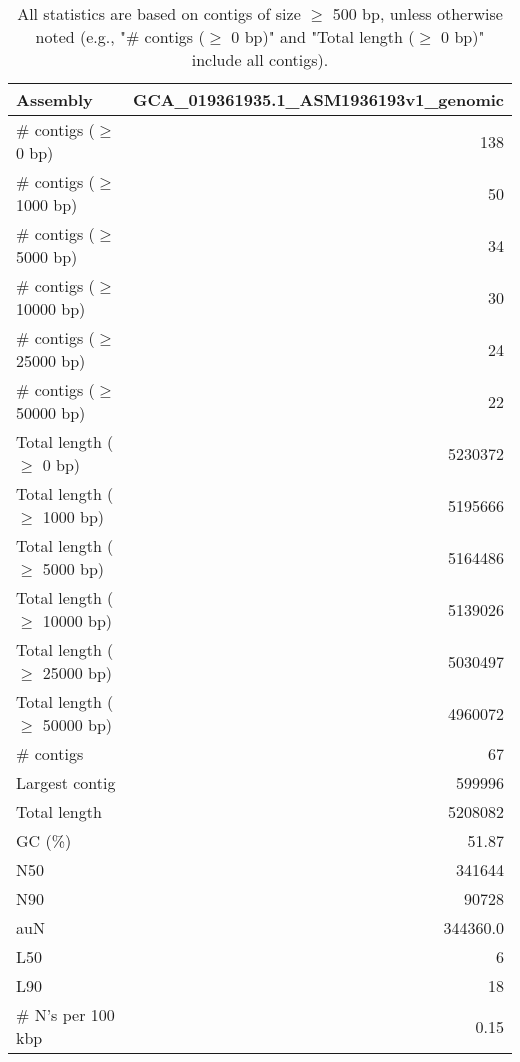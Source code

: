 \documentclass[12pt,a4paper]{article}
\begin{document}
\begin{table}[ht]
\begin{center}
\caption{All statistics are based on contigs of size $\geq$ 500 bp, unless otherwise noted (e.g., "\# contigs ($\geq$ 0 bp)" and "Total length ($\geq$ 0 bp)" include all contigs).}
\begin{tabular}{|l*{1}{|r}|}
\hline
Assembly & GCA\_019361935.1\_ASM1936193v1\_genomic \\ \hline
\# contigs ($\geq$ 0 bp) & 138 \\ \hline
\# contigs ($\geq$ 1000 bp) & 50 \\ \hline
\# contigs ($\geq$ 5000 bp) & 34 \\ \hline
\# contigs ($\geq$ 10000 bp) & 30 \\ \hline
\# contigs ($\geq$ 25000 bp) & 24 \\ \hline
\# contigs ($\geq$ 50000 bp) & 22 \\ \hline
Total length ($\geq$ 0 bp) & 5230372 \\ \hline
Total length ($\geq$ 1000 bp) & 5195666 \\ \hline
Total length ($\geq$ 5000 bp) & 5164486 \\ \hline
Total length ($\geq$ 10000 bp) & 5139026 \\ \hline
Total length ($\geq$ 25000 bp) & 5030497 \\ \hline
Total length ($\geq$ 50000 bp) & 4960072 \\ \hline
\# contigs & 67 \\ \hline
Largest contig & 599996 \\ \hline
Total length & 5208082 \\ \hline
GC (\%) & 51.87 \\ \hline
N50 & 341644 \\ \hline
N90 & 90728 \\ \hline
auN & 344360.0 \\ \hline
L50 & 6 \\ \hline
L90 & 18 \\ \hline
\# N's per 100 kbp & 0.15 \\ \hline
\end{tabular}
\end{center}
\end{table}
\end{document}
